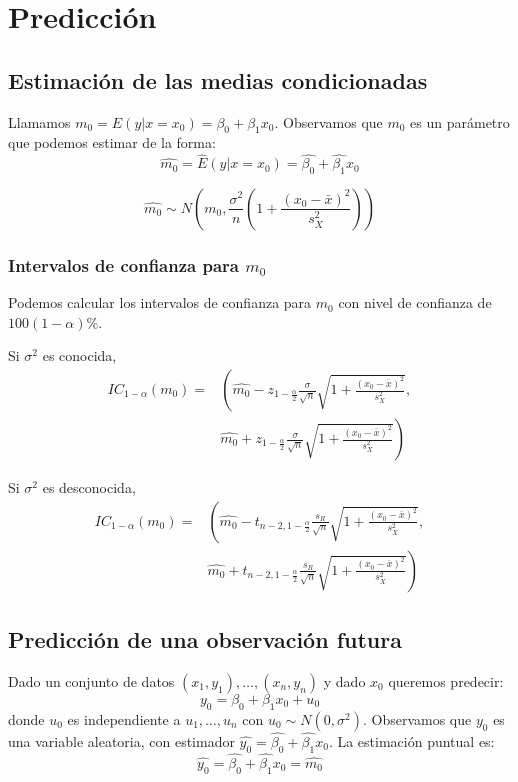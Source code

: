 \section{Predicción}

\subsection*{Estimación de las medias condicionadas}
Llamamos $m_0 = E(y | x=x_0) = \beta_0 + \beta_1x_0$.
Observamos que $m_0$ es un parámetro que podemos estimar de la forma:
$$\hat{m_0} = \hat{E}(y | x=x_0) = \hat{\beta_0} + \hat{\beta_1}x_0$$

\begin{theorem}
    $$\hat{m_0} \sim N\left( m_0, \frac{\sigma^2}{n} \left(1+\frac{(x_0-\bar{x})^2}{s_X^2}\right) \right)$$
\end{theorem}

\subsubsection*{Intervalos de confianza para $m_0$}
Podemos calcular los intervalos de confianza para $m_0$ con nivel de confianza de $100(1-\alpha)\%$.

Si $\sigma^2$ es conocida,
\begin{align*}
    IC_{1-\alpha}(m_0) = & \left( \hat{m_0} - z_{1-\frac{\alpha}{2}} \frac{\sigma}{\sqrt{n}} \sqrt{1 + \frac{(x_0-\bar{x})^2}{s_X^2}}, \right. \\
    & \left. \hat{m_0} + z_{1-\frac{\alpha}{2}} \frac{\sigma}{\sqrt{n}} \sqrt{1 + \frac{(x_0-\bar{x})^2}{s_X^2}} \right)
\end{align*}

Si $\sigma^2$ es desconocida,
\begin{align*}
    IC_{1-\alpha}(m_0) = & \left( \hat{m_0} - t_{n-2, 1-\frac{\alpha}{2}} \frac{s_R}{\sqrt{n}} \sqrt{1 + \frac{(x_0-\bar{x})^2}{s_X^2}}, \right. \\
    & \left. \hat{m_0} + t_{n-2, 1-\frac{\alpha}{2}} \frac{s_R}{\sqrt{n}} \sqrt{1 + \frac{(x_0-\bar{x})^2}{s_X^2}} \right)
\end{align*}

\subsection*{Predicción de una observación futura}
Dado un conjunto de datos $(x_1, y_1), \dots, (x_n, y_n)$ y dado $x_0$ queremos predecir:
$$y_0 = \beta_0 + \beta_1 x_0 + u_0$$
donde $u_0$ es independiente a $u_1, \dots, u_n$ con $u_0 \sim N(0, \sigma^2)$.
Observamos que $y_0$ es una variable aleatoria, con estimador $\hat{y_0} = \hat{\beta_0} + \hat{\beta_1}x_0$.
La estimación puntual es:
$$\hat{y_0} = \hat{\beta_0} + \hat{\beta_1}x_0 = \hat{m_0}$$

